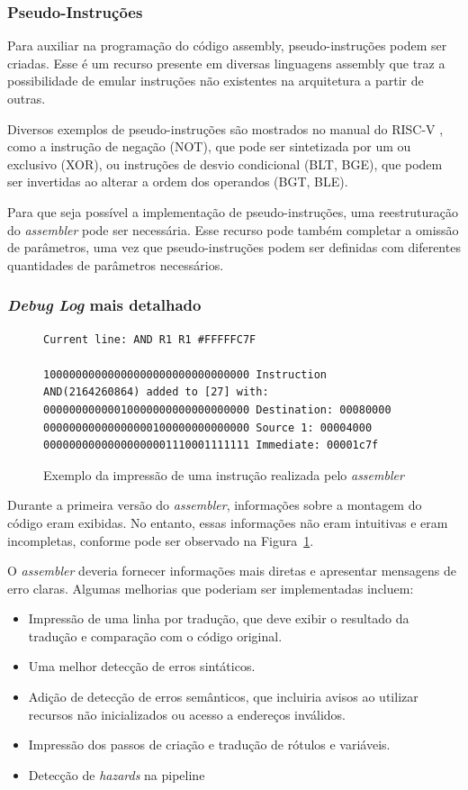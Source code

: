 \documentclass[
	12pt,				%
	openright,			%
	oneside,			%
	a4paper,			%
	english,			%
	french,				%
	spanish,			%
	brazil,				%
	]{abntex2}
\begin{document}
\subsubsection{Pseudo-Instruções}\label{recursos_pseudo_inst}%
Para auxiliar na programação do código assembly, pseudo-instruções podem ser criadas. Esse é um recurso presente em diversas linguagens assembly que traz a possibilidade de emular instruções não existentes na arquitetura a partir de outras.

Diversos exemplos de pseudo-instruções são mostrados no manual do RISC-V \cite{risc-v_risc-v_2024}, como a instrução de negação (NOT), que pode ser sintetizada por um ou exclusivo (XOR), ou instruções de desvio condicional (BLT, BGE), que podem ser invertidas ao alterar a ordem dos operandos (BGT, BLE).

Para que seja possível a implementação de pseudo-instruções, uma reestruturação do \textit{assembler} pode ser necessária. Esse recurso pode também completar a omissão de parâmetros, uma vez que pseudo-instruções podem ser definidas com diferentes quantidades de parâmetros necessários.

\subsubsection{\textit{Debug Log} mais detalhado}\label{recursos_debug_log}
\begin{figure}[h]
\centering
\begin{lstlisting}
Current line: AND R1 R1 #FFFFFC7F

10000000000000000000000000000000 Instruction AND(2164260864) added to [27] with:
00000000000010000000000000000000 Destination: 00080000
00000000000000000100000000000000 Source 1: 00004000
00000000000000000001110001111111 Immediate: 00001c7f
\end{lstlisting}
\caption{Exemplo da impressão de uma instrução realizada pelo \textit{assembler}}
\label{fig:assemblerRuim}
\end{figure}

Durante a primeira versão do \textit{assembler}, informações sobre a montagem do código eram exibidas. No entanto, essas informações não eram intuitivas e eram incompletas, conforme pode ser observado na Figura~\ref{fig:assemblerRuim}.

O \textit{assembler} deveria fornecer informações mais diretas e apresentar mensagens de erro claras. Algumas melhorias que poderiam ser implementadas incluem:
\begin{itemize}
  \item Impressão de uma linha por tradução, que deve exibir o resultado da tradução e comparação com o código original.
  \item Uma melhor detecção de erros sintáticos.
  \item Adição de detecção de erros semânticos, que incluiria avisos ao utilizar recursos não inicializados ou acesso a endereços inválidos.
  \item Impressão dos passos de criação e tradução de rótulos e variáveis.
  \item Detecção de \textit{hazards} na pipeline
\end{itemize}
\end{document}
